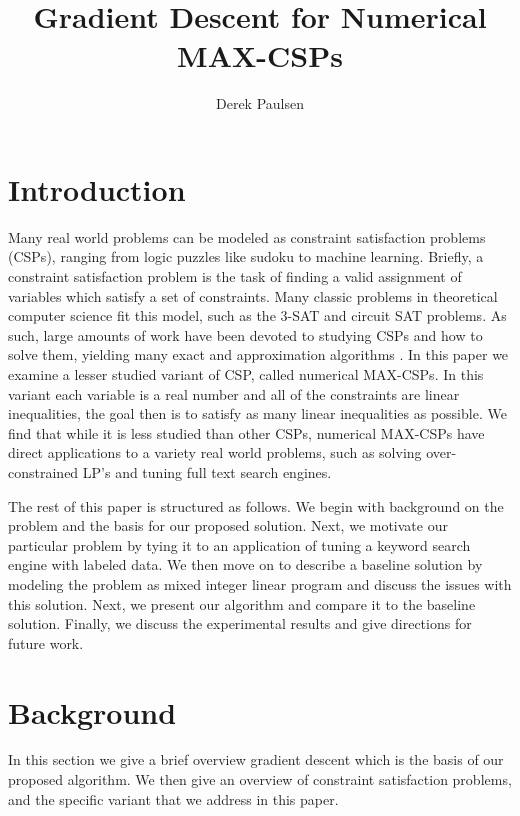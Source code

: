 \documentclass[a4paper]{article}
\title{Gradient Descent for Numerical MAX-CSPs} %
\author{
Derek Paulsen \\
}
\date{}
\begin{document}
\maketitle 


\section{Introduction}


Many real world problems can be modeled as constraint satisfaction problems (CSPs),
ranging from logic puzzles like sudoku to machine learning. Briefly, a
constraint satisfaction problem is the task of finding a valid assignment of
variables which satisfy a set of constraints. Many classic problems in
theoretical computer science fit this model, such as the 3-SAT and circuit SAT
problems. As such, large amounts of work have been
devoted to studying CSPs and how to solve them, yielding many exact and
approximation algorithms \cite{approx_for_csp_paper}. In this paper we examine a lesser studied variant of
CSP, called numerical MAX-CSPs. In this variant each variable is a real number
and all of the constraints are linear inequalities, the goal then is to satisfy
as many linear inequalities as possible. We find that while it is less
studied than other CSPs, numerical MAX-CSPs have direct applications to 
a variety real world problems, such as solving over-constrained LP's and 
tuning full text search engines.

The rest of this paper is structured as follows. We begin with background
on the problem and the basis for our proposed solution. Next, we motivate our particular
problem by tying it to an application of tuning a keyword search engine with labeled data. We
then move on to describe a baseline solution by modeling the problem as mixed
integer linear program and discuss the issues with this solution. Next, we
present our algorithm and compare it to the baseline solution. Finally, we
discuss the experimental results and give directions for future work.

\section{Background}

In this section we give a brief overview gradient descent which
is the basis of our proposed algorithm. We then give
an overview of constraint satisfaction problems,
and the specific variant that we address in this paper.
\end{document}
